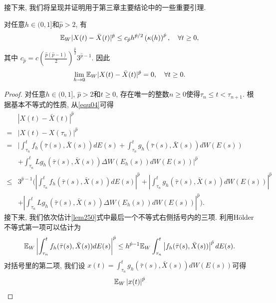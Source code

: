 接下来, 我们将呈现并证明用于第三章主要结论中的一些重要引理.
\begin{lemma}
    \label{lemma2}
    对任意$h\in (0,1]$和$\hat{p}>2$, 有
    \begin{align}
        \label{equ06}
        \mathbb{E}_W|X(t)-\bar{X}(t)|^{\hat{p}}\leq c_{\hat{p}}h^{\hat{p}/2}\left(\kappa(h)\right)^{\hat{p}},\quad \forall t\geq 0,
    \end{align}
    其中
     $c_{\hat{p}}=c\left(\frac{\hat{p}(\hat{p}-1)}{2}\right)^{\frac{\hat{p}}{2}}3^{\hat{p}-1}$. 因此
    \begin{align}
        \label{equ07}
        \lim_{h\rightarrow 0}\mathbb{E}_W|X(t)-\bar{X}(t)|^{\hat{p}}=0,\quad \forall t\geq 0.
    \end{align}
\end{lemma}
\begin{proof}
对任意$h\in (0,1]$, $\hat{p}>2$和$t\geq 0$, 存在唯一的整数$n\geq 0$使得$\tau_n\leq t < \tau_{n+1}$. 根据基本不等式的性质, 从\eqref{equ04}可得
\begin{align}
    \label{lem250}
    &|X(t)-\bar{X}(t)|^{\hat{p}}\nonumber\\
    =&|X(t)-X(\tau_n)|^{\hat{p}}\nonumber\\
    =&\bigg|\int_{\tau_n}^{t}{f_{h}(\bar{\tau}(s),\bar{X}(s))dE(s)} +\int_{\tau_n}^{t}{g_{h}(\bar{\tau}(s),\bar{X}(s))dW(E(s))} \nonumber\\
    &+\int_{\tau_n}^{t}{Lg_{h}(\bar{\tau}(s),\bar{X}(s))\Delta W(E_{h}(s))dW(E(s))}\bigg|^{\hat{p}}\nonumber\\
    \leq&3^{\hat{p}-1}\bigg(\left|\int_{\tau_n}^{t}{f_{h}(\bar{\tau}(s),\bar{X}(s))dE(s)} \right|^{\hat{p}}+\left|\int_{\tau_n}^{t}{g_{h}(\bar{\tau}(s),\bar{X}(s))dW(E(s))} \right|^{\hat{p}}\nonumber\\
    &+\left|\int_{\tau_n}^{t}{Lg_{h}(\bar{\tau}(s),\bar{X}(s))\Delta W(E_{h}(s))dW(E(s))} \right|^{\hat{p}}\bigg).
\end{align}
接下来, 我们依次估计\eqref{lem250}式中最后一个不等式右侧括号内的三项. 利用H{\"o}lder不等式第一项可以估计为
\begin{align}
    \label{lem38}
    \mathbb{E}_W\left|\int_{\tau_n}^{t}{f_{h}(\bar{\tau}(s),\bar{X}(s))dE(s)} \right|^{\hat{p}}\leq h^{\hat{p}-1}\mathbb{E}_W\int_{\tau_n}^{t}{\left|f_{h}(\bar{\tau}(s),\bar{X}(s))\right|^{\hat{p}} dE(s)}.
\end{align}
对括号里的第二项, 我们设 $x(t)=\int_{\tau_n}^{t}{g_{h}(\bar{\tau}(s),\bar{X}(s))dW(E(s))}$可得
 \begin{align*}
    &\EE_W\left| x(t)\right|^{\hat{p}}\\

\end{align*}
\end{proof}
